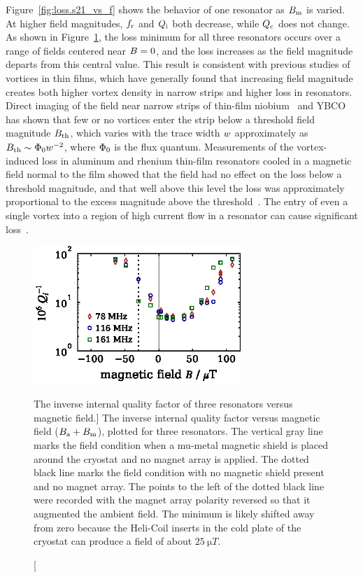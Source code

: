 Figure~\ref{fig:loss.s21_vs_f} shows the behavior of one resonator as $B_{\mathrm{m}}$ is varied.
At higher field magnitudes, $f_{\mathrm{r}}$ and $Q_{\mathrm{i}}$ both decrease, while $Q_{\mathrm{c}}$ does not change.
As shown in Figure~\ref{fig:loss.iQi_vs_B}, the loss minimum for all three resonators occurs over a range of fields centered near $B = 0$, and the loss increases as the field magnitude departs from this central value.
This result is consistent with previous studies of vortices in thin films, which have generally found that increasing field magnitude creates both higher vortex density in narrow strips and higher loss in resonators.
Direct imaging of the field near narrow strips of thin-film niobium~\autocite{Stan2004PRL} and YBCO~\autocite{Kuit2008PRB} has shown that few or no vortices enter the strip below a threshold field magnitude $B_{\mathrm{th}}$, which varies with the trace width $w$ approximately as
$B_{\mathrm{th}} \sim \Phi_0 w^{-2}$,
where $\Phi_0$ is the flux quantum.
Measurements of the vortex-induced loss in aluminum and rhenium thin-film resonators cooled in a magnetic field normal to the film showed that the field had no effect on the loss below a threshold magnitude, and that well above this level the loss was approximately proportional to the excess magnitude above the threshold~\autocite{Song2009PRB}.
The entry of even a single vortex into a region of high current flow in a resonator can cause significant loss~\autocite{Nsanzineza2014PRL}.

\begin{figure}[tb]
\centering
\includegraphics[width=0.7\textwidth]{loss/iQi_vs_B.eps}
\caption
[The inverse internal quality factor of three resonators versus magnetic field.]
{The inverse internal quality factor versus magnetic field ($B_{\mathrm{a}} + B_{\mathrm{m}}$), plotted for three resonators.
The vertical gray line marks the field condition when a mu-metal magnetic shield is placed around the cryostat and no magnet array is applied.
The dotted black line marks the field condition with no magnetic shield present and no magnet array.
The points to the left of the dotted black line were recorded with the magnet array polarity reversed so that it augmented the ambient field.
The minimum is likely shifted away from zero because the Heli-Coil inserts in the cold plate of the cryostat can produce a field of about $\SI{25}{\micro T}$.}
\label{fig:loss.iQi_vs_B}
\end{figure}

